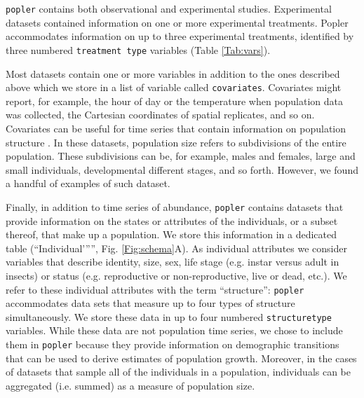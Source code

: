 \documentclass{article}\usepackage[]{graphicx}\usepackage[]{color}
\newcommand{\tom}[1]{{\textit{\color{red}{[#1]}}}}
\begin{document}
\texttt{popler} contains both observational and experimental studies. Experimental datasets contained information on one or more experimental treatments. Popler accommodates information on up to three experimental treatments, identified by three numbered \texttt{treatment type} variables (Table \ref{Tab:vars}). 

Most datasets contain one or more variables in addition to the ones described above which we store in a list of variable called \texttt{covariates}. Covariates might report, for example, the hour of day or the temperature when population data was collected, the Cartesian coordinates of spatial replicates, and so on.
Covariates can be useful for time series that contain information on population structure \tom{Would this be indicated in the metadata? How would someone search for such studies or know if they are working with one?}. In these datasets, population size refers to subdivisions of the entire population. These subdivisions can be, for example, males and females, large and small individuals, developmental different stages, and so forth. However, we found a handful of examples of such dataset.

Finally, in addition to time series of abundance, \texttt{popler} contains datasets that provide information on the states or attributes of the individuals, or a subset thereof, that make up a population. We store this information in a dedicated table (``Individual'”'', Fig. \ref{Fig:schema}A). As individual attributes we consider variables that describe identity, size, sex, life stage (e.g. instar versus adult in insects) or status (e.g. reproductive or non-reproductive, live or dead, etc.). We refer to these individual attributes with the term ``structure'': \texttt{popler} accommodates data sets that measure up to four types of structure simultaneously. We store these data in up to four numbered \texttt{structure\textunderscore type} variables. While these data are not population time series, we chose to include them in \texttt{popler} because they provide information on demographic transitions that can be used to derive estimates of population growth. Moreover, in the cases of datasets that sample all of the individuals in a population, individuals can be aggregated (i.e. summed) as a measure of population size. \tom{Are `structure' and `individual' operationally the same thing? Would there ever be individual data that is not somehow `structured'? Seems like no, especially if identity is treated as structure. I am wondering if we can simplify this by just calling this individual-level data, and saying that this will always be accompanied by one or more individual attributes. We introduce the concept of structure above, as a possible covariates for time series. Here `structure' has a related but different interpretation. I would like to prevent confusion.}
\end{document}
